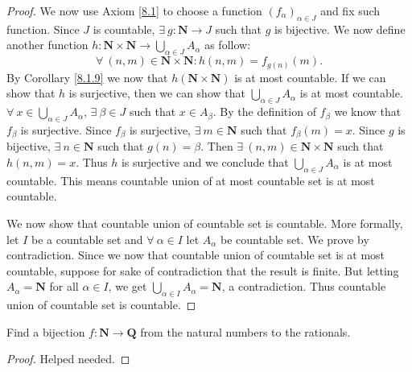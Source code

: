 \begin{proof}
    We now use Axiom \ref{8.1} to choose a function \((f_{\alpha})_{\alpha \in J}\) and fix such function.
    Since \(J\) is countable, \(\exists\ g : \mathbf{N} \to J\) such that \(g\) is bijective.
    We now define another function \(h : \mathbf{N} \times \mathbf{N} \to \bigcup_{\alpha \in J} A_{\alpha}\) as follow:
    \[
        \forall\ (n, m) \in \mathbf{N} \times \mathbf{N} : h(n, m) = f_{g(n)}(m).
    \]
    By Corollary \ref{8.1.9} we now that \(h(\mathbf{N} \times \mathbf{N})\) is at most countable.
    If we can show that \(h\) is surjective, then we can show that \(\bigcup_{\alpha \in J} A_{\alpha}\) is at most countable.
    \(\forall\ x \in \bigcup_{\alpha \in J} A_{\alpha}\), \(\exists\ \beta \in J\) such that \(x \in A_{\beta}\).
    By the definition of \(f_{\beta}\) we know that \(f_{\beta}\) is surjective.
    Since \(f_{\beta}\) is surjective, \(\exists\ m \in \mathbf{N}\) such that \(f_{\beta}(m) = x\).
    Since \(g\) is bijective, \(\exists\ n \in \mathbf{N}\) such that \(g(n) = \beta\).
    Then \(\exists\ (n, m) \in \mathbf{N} \times \mathbf{N}\) such that \(h(n, m) = x\).
    Thus \(h\) is surjective and we conclude that \(\bigcup_{\alpha \in J} A_{\alpha}\) is at most countable.
    This means countable union of at most countable set is at most countable.

    We now show that countable union of countable set is countable.
    More formally, let \(I\) be a countable set and \(\forall\ \alpha \in I\) let \(A_{\alpha}\) be countable set.
    We prove by contradiction.
    Since we now that countable union of countable set is at most countable, suppose for sake of contradiction that the result is finite.
    But letting \(A_{\alpha} = \mathbf{N}\) for all \(\alpha \in I\), we get \(\bigcup_{\alpha \in I} A_{\alpha} = \mathbf{N}\), a contradiction.
    Thus countable union of countable set is countable.
\end{proof}

\begin{exercise}\label{ex 8.1.10}
    Find a bijection \(f : \mathbf{N} \to \mathbf{Q}\) from the natural numbers to the rationals.
\end{exercise}

\begin{proof}
    Helped needed.
\end{proof}